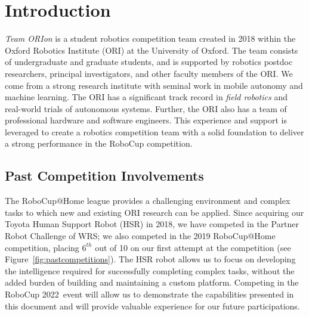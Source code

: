 \documentclass[runningheads,a4paper]{llncs}
\newcommand{\teamori}{Team ORIon}
\newcommand{\competitionyear}{2022}
\newcommand{\robocuptitleshort}{RoboCup \competitionyear}
\begin{document}


\section{Introduction}

\textit{\teamori{}} is a student robotics competition team created in 2018 within the Oxford Robotics Institute (ORI) at the University of Oxford. 
The team consists of undergraduate and graduate students, and is supported by robotics postdoc researchers, principal investigators, and other faculty members of the ORI. 
We come from a strong research institute with seminal work in mobile autonomy and machine learning. The ORI has a significant track record in \emph{field robotics} and real-world trials of autonomous systems.
Further, the ORI also has a team of professional hardware and software engineers. This experience and support is leveraged to create a robotics competition team with a solid foundation to deliver a strong performance in the RoboCup competition.

\subsection{Past Competition Involvements}
The RoboCup@Home league provides a challenging environment and complex tasks to which new and existing ORI research can be applied. 
Since acquiring our Toyota Human Support Robot (HSR) in 2018, we have competed in the Partner Robot Challenge of WRS; we also competed in the 2019 RoboCup@Home competition, placing $6^{th}$ out of 10 on our first attempt at the competition (see Figure~\ref{fig:pastcompetitions}). 
The HSR robot allows us to focus on developing the
intelligence required for successfully completing complex tasks, 
without the added burden of building and maintaining a custom platform. 
Competing in the \robocuptitleshort\ event will allow us to demonstrate the capabilities presented in this document and will provide valuable experience for our future participations.
\end{document}
